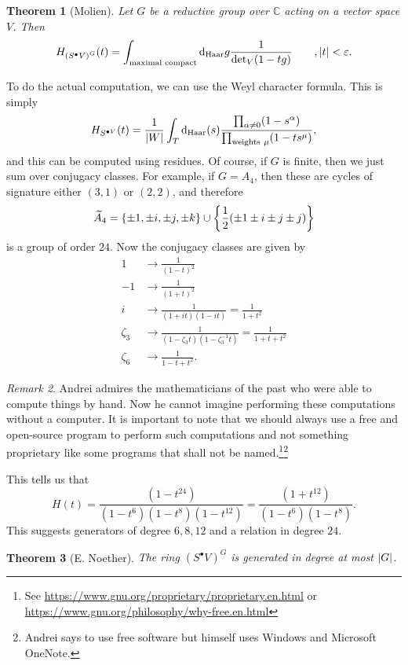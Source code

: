 \documentclass[leqno, openany]{memoir}
\newtheorem{thm}{Theorem}[section]
\theoremstyle{definition}
\theoremstyle{remark}
\newtheorem{rmk}[thm]{Remark}
\theoremstyle{plain}
\theoremstyle{definition}
\theoremstyle{remark}
\newcommand{\C}{\mathbb{C}}
\newcommand{\ep}{\varepsilon}
\newcommand{\mr}[1]{\mathrm{#1}}
\newcommand{\wtl}[1]{\widetilde{#1}}
\begin{document}
\begin{thm}[Molien] Let $G$ be a reductive group over $\C$ acting on a vector
    space $V$. Then \[ H_{{(S^{\bullet} V)}^G}(t) = \int_{\text{maximal
    compact}} \dd_{\mr{Haar}}g \frac{1}{\det_V(1-tg)} \qquad, \abs{t} < \ep. \]
\end{thm}

To do the actual computation, we can use the Weyl character formula. This is
simply \[ H_{S^{\bullet V}}(t) = \frac{1}{\abs{W}} \int_T \dd_{\mr{Haar}}(s)
\frac{\prod_{\alpha \neq 0} (1-s^{\alpha})}{\prod_{\text{weights}\ \mu} (1 -
ts^{\mu})}, \] and this can be computed using residues. Of course, if $G$ is
finite, then we just sum over conjugacy classes. For example, if $G = A_4$,
then these are cycles of signature either $(3,1)$ or $(2,2)$, and therefore \[
\wtl{A}_4 = \qty{\pm 1, \pm i, \pm j, \pm k} \cup \qty{\frac{1}{2}(\pm 1 \pm i
\pm j \pm j)} \] is a group of order $24$. Now the conjugacy classes are given
by \begin{align*} 1 &\longrightarrow \frac{1}{{(1-t)}^2} \\ -1 &\longrightarrow
    \frac{1}{{(1+t)}^2} \\ i &\longrightarrow \frac{1}{(1+it)(1-it)} =
    \frac{1}{1+t^2} \\ \zeta_3 &\longrightarrow \frac{1}{(1-\zeta_3
t)(1-\zeta_3^{-1}t)} = \frac{1}{1+t+t^2} \\ \zeta_6 &\longrightarrow
\frac{1}{1-t+t^2}.  \end{align*}

\begin{rmk} Andrei admires the mathematicians of the past who were able to
    compute things by hand. Now he cannot imagine performing these computations
    without a computer. It is important to note that we should always use a
    free and open-source program to perform such computations and not something
    proprietary like some programs that shall not be named.\footnote{See
    \url{https://www.gnu.org/proprietary/proprietary.en.html} or
\url{https://www.gnu.org/philosophy/why-free.en.html}}\footnote{Andrei says to
use free software but himself uses Windows and Microsoft OneNote.} \end{rmk}

This tells us that \[ H(t) = \frac{(1-t^{24})}{(1-t^6)(1-t^8)(1-t^{12})} =
\frac{(1+t^{12})}{(1-t^6)(1-t^8)}. \] This suggests generators of degree
$6,8,12$ and a relation in degree $24$.

\begin{thm}[E. Noether] The ring ${(S^{\bullet}V)}^G$ is generated in degree at
most $\abs{G}$.  \end{thm}
\end{document}
